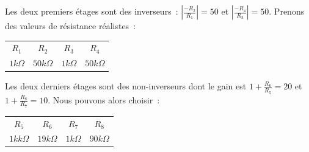 Les deux premiers étages sont des inverseurs~: $\left|\frac{-R_2}{R_1}\right| = 50$ et $\left|\frac{-R_4}{R_3}\right| = 50$.
Prenons des valeurs de résistance réalistes~:
\begin{center}
\begin{tabular}{|cccc|}\hline
$R_1$ & $R_2$ & $R_3$ & $R_4$ \\
$1 k\Omega$ & $50 k\Omega$ & $1 k\Omega$ & $50 k\Omega$ \\ \hline
\end{tabular}
\end{center}

Les deux derniers étages sont des non-inverseurs dont le gain est $1 + \frac{R_6}{R_5} = 20$ et $1 + \frac{R_8}{R_7} = 10$.
Nous pouvons alors choisir~:
\begin{center}
\begin{tabular}{|cccc|}\hline
$R_5$ & $R_6$ & $R_7$ & $R_8$ \\
$1k k\Omega$ & $19 k\Omega$ & $1 k\Omega$ & $90 k\Omega$ \\ \hline
\end{tabular}
\end{center}


